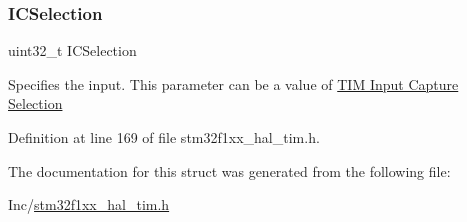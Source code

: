 \mbox{\label{struct_t_i_m___i_c___init_type_def_a280cec08ad0ea4608ae57523775cc1c0}} 
\subsubsection{\texorpdfstring{I\+C\+Selection}{ICSelection}}
{\footnotesize\ttfamily uint32\+\_\+t I\+C\+Selection}

Specifies the input. This parameter can be a value of \hyperlink{group___t_i_m___input___capture___selection}{T\+IM Input Capture Selection} 

Definition at line 169 of file stm32f1xx\+\_\+hal\+\_\+tim.\+h.



The documentation for this struct was generated from the following file\+:\begin{DoxyCompactItemize}
\item 
Inc/\hyperlink{stm32f1xx__hal__tim_8h}{stm32f1xx\+\_\+hal\+\_\+tim.\+h}\end{DoxyCompactItemize}
